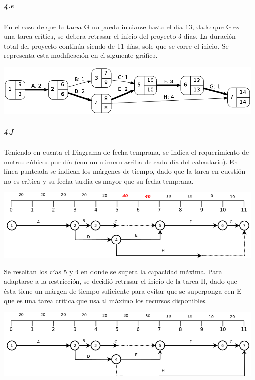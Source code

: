 \documentclass[a4paper,10pt]{article}
\begin{document}
  \subparagraph {4.e} En el caso de que la tarea G no pueda iniciarse hasta el día 13, dado que G es una tarea crítica, se debera retrasar el inicio del proyecto 3 días. 
  La duración total del proyecto continúa siendo de 11 días, solo que se corre el inicio. Se representa esta modificación en el siguiente gráfico.
  \begin{center}
    \includegraphics[scale=0.5,keepaspectratio=true]{img/ej4-e.png} 
  \end{center}
  
  \subparagraph {4.f} Teniendo en cuenta el Diagrama de fecha temprana, se indica el requerimiento de metros cúbicos por día (con un número arriba de cada día del calendario). 
  En línea punteada se indican los márgenes de tiempo, dado que la tarea en cuestión no es crítica y su fecha tardía es mayor que su fecha temprana.
  
  \begin{center}
    \includegraphics[scale=0.55,keepaspectratio=true]{img/ej4-fechatemprana1.png} 
  \end{center}
  
  Se resaltan los días 5 y 6 en donde se supera la capacidad máxima. Para adaptarse a la restricción, se decidió retrasar el inicio de la tarea H, 
  dado que ésta tiene un márgen de tiempo suficiente para evitar que se superponga con E que es una tarea crítica que usa al máximo los recursos disponibles.
  \begin{center}
    \includegraphics[scale=0.55,keepaspectratio=true]{img/ej4-fechatemprana2.png} 
  \end{center}
\end{document}
